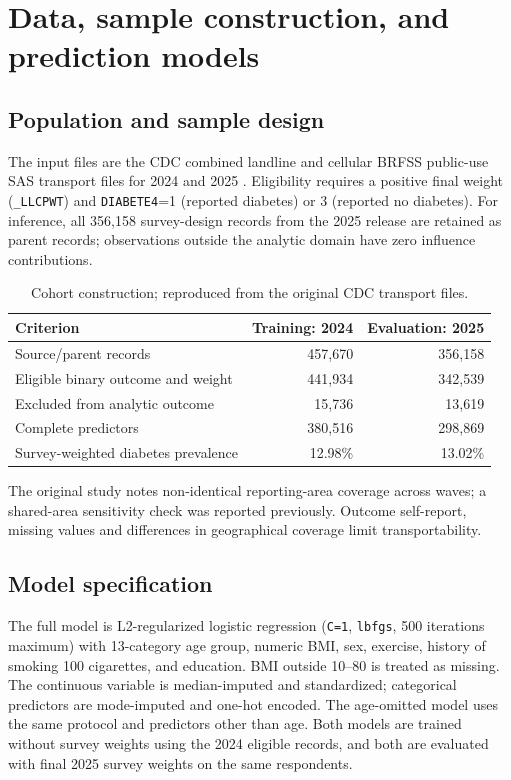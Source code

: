 \section{Data, sample construction, and prediction models}
\subsection{Population and sample design}
The input files are the CDC combined landline and cellular BRFSS public-use SAS transport files for 2024 and 2025 \citep{cdc2024,cdc2025}. Eligibility requires a positive final weight (\texttt{\_LLCPWT}) and \texttt{DIABETE4}=1 (reported diabetes) or 3 (reported no diabetes). For inference, all 356,158 survey-design records from the 2025 release are retained as parent records; observations outside the analytic domain have zero influence contributions.
\begin{table}[H]\centering\caption{Cohort construction; reproduced from the original CDC transport files.}\begin{tabular}{lrr}\toprule
Criterion & Training: 2024 & Evaluation: 2025 \\\midrule
Source/parent records & 457,670 & 356,158 \\
Eligible binary outcome and weight & 441,934 & 342,539 \\
Excluded from analytic outcome & 15,736 & 13,619 \\
Complete predictors & 380,516 & 298,869 \\
Survey-weighted diabetes prevalence & 12.98\% & 13.02\% \\\bottomrule
\end{tabular}\end{table}
The original study notes non-identical reporting-area coverage across waves; a shared-area sensitivity check was reported previously. Outcome self-report, missing values and differences in geographical coverage limit transportability.

\subsection{Model specification}
The full model is L2-regularized logistic regression (\texttt{C=1}, \texttt{lbfgs}, 500 iterations maximum) with 13-category age group, numeric BMI, sex, exercise, history of smoking 100 cigarettes, and education. BMI outside 10--80 is treated as missing. The continuous variable is median-imputed and standardized; categorical predictors are mode-imputed and one-hot encoded. The age-omitted model uses the same protocol and predictors other than age. Both models are trained without survey weights using the 2024 eligible records, and both are evaluated with final 2025 survey weights on the same respondents.


